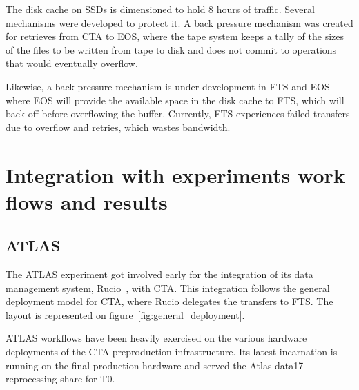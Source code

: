 \documentclass{webofc}
\begin{document}

The disk cache on SSDs is dimensioned to hold 8 hours of traffic.
Several mechanisms were developed to protect it. A back pressure
mechanism was created for retrieves from CTA to EOS, where the tape system keeps a tally of the sizes of the files
to be written from tape to disk and does not commit to operations that would eventually overflow.

Likewise, a back pressure mechanism is under development in FTS and EOS where EOS will provide the available space
in the disk cache to FTS, which will back off before overflowing the buffer. Currently, FTS experiences failed transfers
due to overflow and retries, which wastes bandwidth.

\section{Integration with experiments work flows and results}
\subsection{ATLAS}

The ATLAS experiment got involved early for the integration of its data management system, Rucio~\cite{rucio}, with CTA.
This integration follows the general deployment model for CTA, where Rucio delegates the transfers to FTS. 
The layout is represented on figure~\ref{fig:general_deployment}.

ATLAS workflows have been heavily exercised on the various hardware deployments of the CTA preproduction infrastructure.
Its latest incarnation is running on the final production hardware and served the Atlas data17 reprocessing share for T0.
\end{document}
